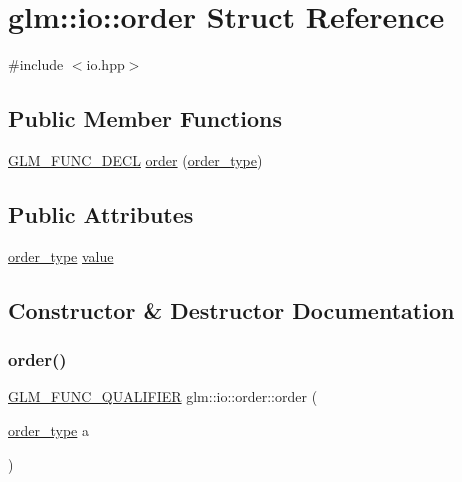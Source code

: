\hypertarget{structglm_1_1io_1_1order}{}\section{glm\+:\+:io\+:\+:order Struct Reference}
\label{structglm_1_1io_1_1order}


{\ttfamily \#include $<$io.\+hpp$>$}

\subsection*{Public Member Functions}
\begin{DoxyCompactItemize}
\item 
\hyperlink{setup_8hpp_ab2d052de21a70539923e9bcbf6e83a51}{G\+L\+M\+\_\+\+F\+U\+N\+C\+\_\+\+D\+E\+CL} \hyperlink{structglm_1_1io_1_1order_a06813d404c975865fdd3a77146268a1f}{order} (\hyperlink{namespaceglm_1_1io_a3497781803fe594a37177e05ab2a795f}{order\+\_\+type})
\end{DoxyCompactItemize}
\subsection*{Public Attributes}
\begin{DoxyCompactItemize}
\item 
\hyperlink{namespaceglm_1_1io_a3497781803fe594a37177e05ab2a795f}{order\+\_\+type} \hyperlink{structglm_1_1io_1_1order_aa8788dd0568bacd081d02bd5aca9889b}{value}
\end{DoxyCompactItemize}


\subsection{Constructor \& Destructor Documentation}
\mbox{\label{structglm_1_1io_1_1order_a06813d404c975865fdd3a77146268a1f}} 
\subsubsection{\texorpdfstring{order()}{order()}}
{\footnotesize\ttfamily \hyperlink{setup_8hpp_a33fdea6f91c5f834105f7415e2a64407}{G\+L\+M\+\_\+\+F\+U\+N\+C\+\_\+\+Q\+U\+A\+L\+I\+F\+I\+ER} glm\+::io\+::order\+::order (\begin{DoxyParamCaption}\item[{\hyperlink{namespaceglm_1_1io_a3497781803fe594a37177e05ab2a795f}{order\+\_\+type}}]{a }\end{DoxyParamCaption})\hspace{0.3cm}{\ttfamily [explicit]}}



